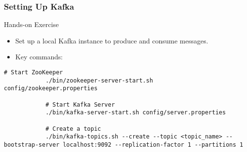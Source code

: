 \documentclass[aspectratio=169]{beamer}
\begin{document}
\begin{frame}[fragile]
    \frametitle{Setting Up Kafka}
    
    \begin{block}{Hands-on Exercise}
        \begin{itemize}
            \item Set up a local Kafka instance to produce and consume messages.
            \item Key commands:
        \end{itemize}
        
        \begin{lstlisting}[basicstyle=\footnotesize]
            # Start ZooKeeper
            ./bin/zookeeper-server-start.sh config/zookeeper.properties
            
            # Start Kafka Server
            ./bin/kafka-server-start.sh config/server.properties
            
            # Create a topic
            ./bin/kafka-topics.sh --create --topic <topic_name> --bootstrap-server localhost:9092 --replication-factor 1 --partitions 1
        \end{lstlisting}
    \end{block}
\end{frame}
\end{document}

